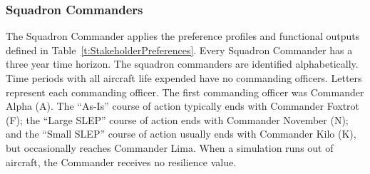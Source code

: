 \documentclass[preprint,12pt]{elsarticle}
\begin{document}
\begin{table}[h]
    \caption{Program Manager Preferred Course of Action}
  \label{t:PreferredCOA_PM_No_Chi}
  \begin{center}
  \end{center}
\end{table}

\subsubsection{Squadron Commanders}

The Squadron Commander applies the preference profiles and functional
outputs defined in Table~\ref{t:StakeholderPreferences}. Every
Squadron Commander has a three year time horizon. The squadron commanders are
identified alphabetically. Time periods with all aircraft life
expended have no commanding officers. Letters represent each
commanding officer. The first commanding officer was 
Commander Alpha (A). The ``As-Is'' course of action typically ends
with Commander Foxtrot (F); the ``Large SLEP'' course of action ends
with Commander November (N); and the ``Small SLEP'' course of action
usually ends with Commander Kilo (K), but occasionally reaches
Commander Lima. When a simulation runs out of aircraft, the Commander
receives no resilience value.
\end{document}
